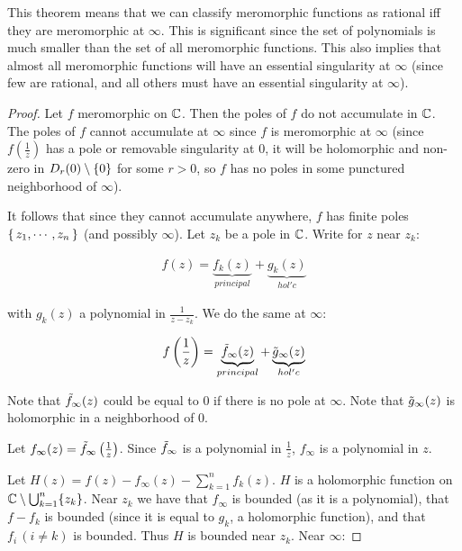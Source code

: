 \begin{note}
This theorem means that we can classify meromorphic functions as rational iff they are meromorphic at $\infty$. This is significant since the set of polynomials is much smaller than the set of all meromorphic functions. This also implies that almost all meromorphic functions will have an essential singularity at $\infty$ (since few are rational, and all others must have an essential singularity at $\infty$).
\end{note}

\begin{proof}
Let $f$ meromorphic on $\mathbb{C}$. Then the poles of $f$ do not accumulate in $\mathbb{C}$. The poles of $f$ cannot accumulate at $\infty$ since $f$ is meromorphic at $\infty$ (since $f(\frac{1}{z})$ has a pole or removable singularity at $0$, it will be holomorphic and non-zero in $D_r (0) \setminus \{ 0 \}$ for some $r>0$, so $f$ has no poles in some punctured neighborhood of $\infty$). 

It follows that since they cannot accumulate anywhere, $f$ has finite poles $\set{z_1, \cdots ,z_n}$ (and possibly $\infty$). Let $z_k$ be a pole in $\mathbb{C}$. Write for $z$ near $z_k$:

\begin{align*}
    f(z) = \underbrace{f_k(z)}_{principal} + \underbrace{g_k(z)}_{hol'c}
\end{align*}

with $g_k(z)$ a polynomial in $\frac{1}{z-z_k}$. We do the same at $\infty$:

\begin{align*}
    f \left( \frac{1}{z} \right) = \underbrace{\Tilde{f}_\infty(z)}_{principal} + \underbrace{\Tilde{g}_\infty(z)}_{hol'c}
\end{align*}

Note that $\Tilde{f}_\infty(z)$ could be equal to $0$ if there is no pole at $\infty$. Note that $\Tilde{g}_\infty(z)$ is holomorphic in a neighborhood of $0$.

Let $f_\infty(z) = \Tilde{f}_\infty\left( \frac{1}{z} \right)$. Since $\Tilde{f}_\infty$ is a polynomial in $\frac{1}{z}$, $f_\infty$ is a polynomial in $z$.

Let $H(z) = f(z) - f_\infty(z) - \sum_{k=1}^n f_k(z)$. $H$ is a holomorphic function on $\mathbb{C} \setminus \bigcup_{k=1}^n \{z_k \}$. Near $z_k$ we have that $f_\infty$ is bounded (as it is a polynomial), that $f-f_k$ is bounded (since it is equal to $g_k$, a holomorphic function), and that $f_i \, (i \neq k)$ is bounded. Thus $H$ is bounded near $z_k$. Near $\infty$: 


\end{proof}
